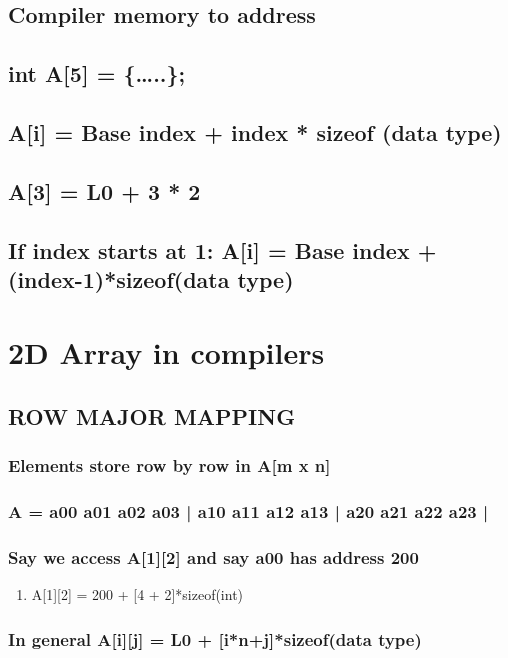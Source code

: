 \documentclass{article}
\begin{document}
\subsection{Compiler memory to address}
\label{sec:orgfd78ed0}
\subsection{int A[5] = \{\ldots{}..\};}
\label{sec:org4e59aa2}
\subsection{A[i] = Base index + index *  sizeof (data type)}
\label{sec:orga6ba84e}
\subsection{A[3] = L0 + 3 * 2}
\label{sec:orgeee39cb}
\subsection{If index starts at 1:  A[i] = Base index + (index-1)*sizeof(data type)}
\label{sec:org5a8efc5}
\section{2D Array in compilers}
\label{sec:org4880e0d}
\subsection{ROW MAJOR MAPPING}
\label{sec:orgea97928}
\subsubsection{Elements store row by row in A[m x n]}
\label{sec:orgfb52e6b}
\subsubsection{A = a00 a01 a02 a03 | a10 a11 a12 a13 | a20 a21 a22 a23 |}
\label{sec:org9b5e58e}
\subsubsection{Say we access A[1][2] and say a00 has address 200}
\label{sec:org485de3e}
\begin{enumerate}
\item A[1][2] = 200 + [4 + 2]*sizeof(int)
\label{sec:org5775452}
\end{enumerate}
\subsubsection{In general A[i][j] = \textbf{L0 + [i*n+j]*sizeof(data type)}}
\label{sec:org4e06554}
\end{document}
